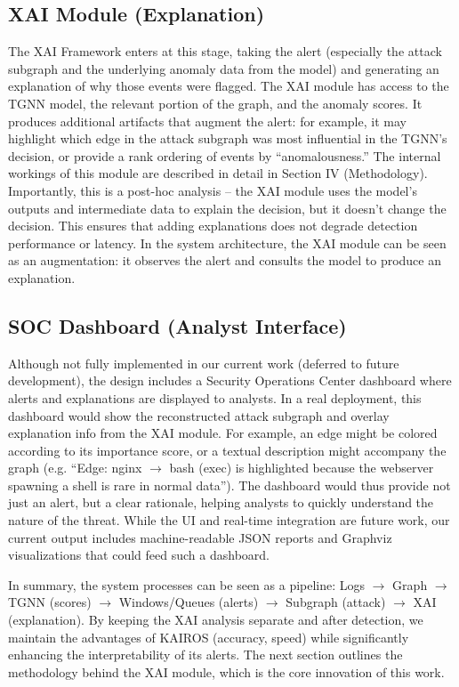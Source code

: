 \documentclass[conference]{IEEEtran}
\begin{document}
\subsection{XAI Module (Explanation)}
The XAI Framework enters at this stage, taking the alert (especially the attack subgraph and the underlying anomaly data from the model) and generating an explanation of why those events were flagged. The XAI module has access to the TGNN model, the relevant portion of the graph, and the anomaly scores. It produces additional artifacts that augment the alert: for example, it may highlight which edge in the attack subgraph was most influential in the TGNN's decision, or provide a rank ordering of events by ``anomalousness.'' The internal workings of this module are described in detail in Section IV (Methodology). Importantly, this is a post-hoc analysis -- the XAI module uses the model's outputs and intermediate data to explain the decision, but it doesn’t change the decision. This ensures that adding explanations does not degrade detection performance or latency. In the system architecture, the XAI module can be seen as an augmentation: it observes the alert and consults the model to produce an explanation.

\subsection{SOC Dashboard (Analyst Interface)}
Although not fully implemented in our current work (deferred to future development), the design includes a Security Operations Center dashboard where alerts and explanations are displayed to analysts. In a real deployment, this dashboard would show the reconstructed attack subgraph and overlay explanation info from the XAI module. For example, an edge might be colored according to its importance score, or a textual description might accompany the graph (e.g. ``Edge: nginx $\rightarrow$ bash (exec) is highlighted because the webserver spawning a shell is rare in normal data''). The dashboard would thus provide not just an alert, but a clear rationale, helping analysts to quickly understand the nature of the threat. While the UI and real-time integration are future work, our current output includes machine-readable JSON reports and Graphviz visualizations that could feed such a dashboard.

In summary, the system processes can be seen as a pipeline: Logs $\rightarrow$ Graph $\rightarrow$ TGNN (scores) $\rightarrow$ Windows/Queues (alerts) $\rightarrow$ Subgraph (attack) $\rightarrow$ XAI (explanation). By keeping the XAI analysis separate and after detection, we maintain the advantages of KAIROS (accuracy, speed) while significantly enhancing the interpretability of its alerts. The next section outlines the methodology behind the XAI module, which is the core innovation of this work.
\end{document}
